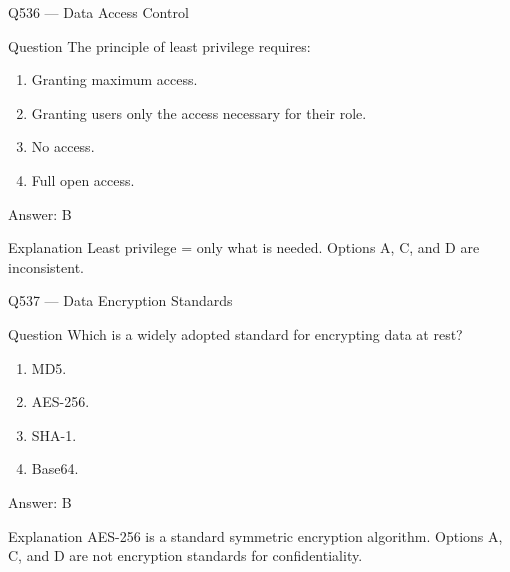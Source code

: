 \documentclass[aspectratio=169,8pt]{beamer}
\begin{document}
	\begin{frame}{Q536 --- Data Access Control}
		\begin{block}{Question}
			The principle of least privilege requires:
			\begin{enumerate}
				\item Granting maximum access.
				\item Granting users only the access necessary for their role.
				\item No access.
				\item Full open access.
			\end{enumerate}
		\end{block}
		\begin{exampleblock}{Answer: B}\end{exampleblock}
		\begin{block}{Explanation}
			Least privilege = only what is needed. Options A, C, and D are inconsistent.
		\end{block}
	\end{frame}
	
	\begin{frame}{Q537 --- Data Encryption Standards}
		\begin{block}{Question}
			Which is a widely adopted standard for encrypting data at rest?
			\begin{enumerate}
				\item MD5.
				\item AES-256.
				\item SHA-1.
				\item Base64.
			\end{enumerate}
		\end{block}
		\begin{exampleblock}{Answer: B}\end{exampleblock}
		\begin{block}{Explanation}
			AES-256 is a standard symmetric encryption algorithm. Options A, C, and D are not encryption standards for confidentiality.
		\end{block}
	\end{frame}
	
\end{document}
